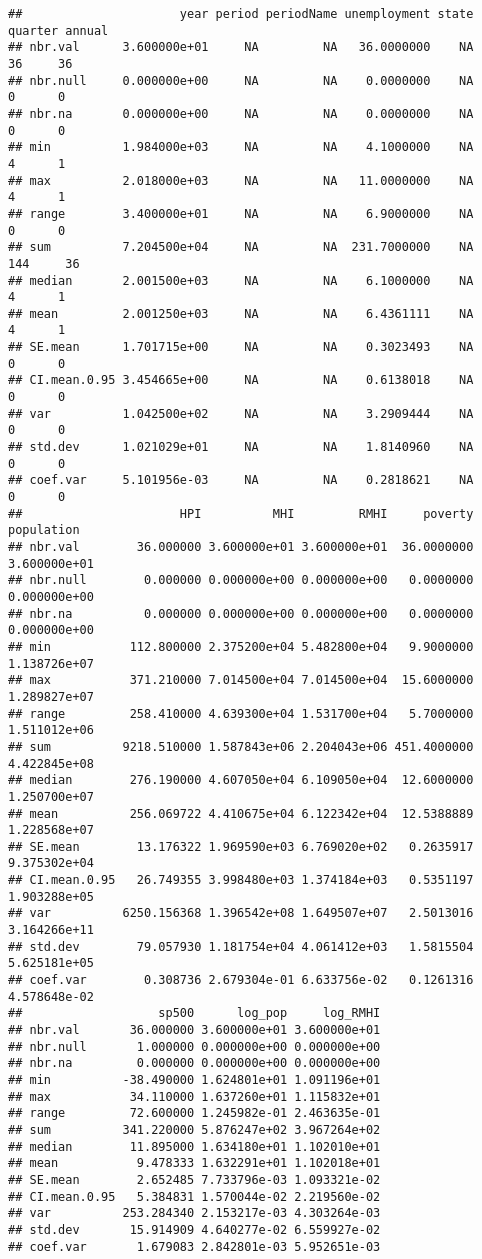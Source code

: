 \documentclass[
]{article}
\begin{document}
\begin{verbatim}
##                      year period periodName unemployment state quarter annual
## nbr.val      3.600000e+01     NA         NA   36.0000000    NA      36     36
## nbr.null     0.000000e+00     NA         NA    0.0000000    NA       0      0
## nbr.na       0.000000e+00     NA         NA    0.0000000    NA       0      0
## min          1.984000e+03     NA         NA    4.1000000    NA       4      1
## max          2.018000e+03     NA         NA   11.0000000    NA       4      1
## range        3.400000e+01     NA         NA    6.9000000    NA       0      0
## sum          7.204500e+04     NA         NA  231.7000000    NA     144     36
## median       2.001500e+03     NA         NA    6.1000000    NA       4      1
## mean         2.001250e+03     NA         NA    6.4361111    NA       4      1
## SE.mean      1.701715e+00     NA         NA    0.3023493    NA       0      0
## CI.mean.0.95 3.454665e+00     NA         NA    0.6138018    NA       0      0
## var          1.042500e+02     NA         NA    3.2909444    NA       0      0
## std.dev      1.021029e+01     NA         NA    1.8140960    NA       0      0
## coef.var     5.101956e-03     NA         NA    0.2818621    NA       0      0
##                      HPI          MHI         RMHI     poverty   population
## nbr.val        36.000000 3.600000e+01 3.600000e+01  36.0000000 3.600000e+01
## nbr.null        0.000000 0.000000e+00 0.000000e+00   0.0000000 0.000000e+00
## nbr.na          0.000000 0.000000e+00 0.000000e+00   0.0000000 0.000000e+00
## min           112.800000 2.375200e+04 5.482800e+04   9.9000000 1.138726e+07
## max           371.210000 7.014500e+04 7.014500e+04  15.6000000 1.289827e+07
## range         258.410000 4.639300e+04 1.531700e+04   5.7000000 1.511012e+06
## sum          9218.510000 1.587843e+06 2.204043e+06 451.4000000 4.422845e+08
## median        276.190000 4.607050e+04 6.109050e+04  12.6000000 1.250700e+07
## mean          256.069722 4.410675e+04 6.122342e+04  12.5388889 1.228568e+07
## SE.mean        13.176322 1.969590e+03 6.769020e+02   0.2635917 9.375302e+04
## CI.mean.0.95   26.749355 3.998480e+03 1.374184e+03   0.5351197 1.903288e+05
## var          6250.156368 1.396542e+08 1.649507e+07   2.5013016 3.164266e+11
## std.dev        79.057930 1.181754e+04 4.061412e+03   1.5815504 5.625181e+05
## coef.var        0.308736 2.679304e-01 6.633756e-02   0.1261316 4.578648e-02
##                   sp500      log_pop     log_RMHI
## nbr.val       36.000000 3.600000e+01 3.600000e+01
## nbr.null       1.000000 0.000000e+00 0.000000e+00
## nbr.na         0.000000 0.000000e+00 0.000000e+00
## min          -38.490000 1.624801e+01 1.091196e+01
## max           34.110000 1.637260e+01 1.115832e+01
## range         72.600000 1.245982e-01 2.463635e-01
## sum          341.220000 5.876247e+02 3.967264e+02
## median        11.895000 1.634180e+01 1.102010e+01
## mean           9.478333 1.632291e+01 1.102018e+01
## SE.mean        2.652485 7.733796e-03 1.093321e-02
## CI.mean.0.95   5.384831 1.570044e-02 2.219560e-02
## var          253.284340 2.153217e-03 4.303264e-03
## std.dev       15.914909 4.640277e-02 6.559927e-02
## coef.var       1.679083 2.842801e-03 5.952651e-03
\end{verbatim}
\end{document}
